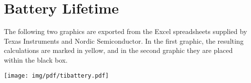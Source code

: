 \section{Battery Lifetime} %
\label{sec:battery_life_appendix}

The following two graphics are exported from the Excel spreadsheets supplied by Texas Instruments and Nordic Semiconductor. In the first graphic, the resulting calculations are marked in yellow, and in the second graphic they are placed within the black box.

\texttt{[image: img/pdf/tibattery.pdf]}


